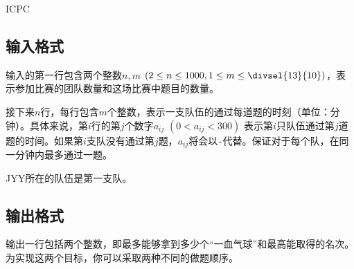 \begin{Problem}{ICPC}{}
\subsection*{输入格式}

输入的第一行包含两个整数$n, m$ $(2 \leq n \leq 1000, 1 \leq m \leq \divsel{13}{10})$，表示参加比赛的团队数量和这场比赛中题目的数量。

接下来$n$行，每行包含$m$个整数，表示一支队伍的通过每道题的时刻（单位：分钟）。具体来说，第$i$行的第$j$个数字$a_{ij}$ $(0 < a_{ij} < 300)$ 表示第$i$只队伍通过第$j$道题的时间。如果第$i$支队没有通过第$j$题，$a_{ij}$将会以\texttt{-}代替。保证对于每个队，在同一分钟内最多通过一题。

JYY所在的队伍是第一支队。

\subsection*{输出格式}

输出一行包括两个整数，即最多能够拿到多少个“一血气球”和最高能取得的名次。为实现这两个目标，你可以采取两种不同的做题顺序。

\ifodd\value{page}
\clearpage
\else
\fi


\end{Problem}


